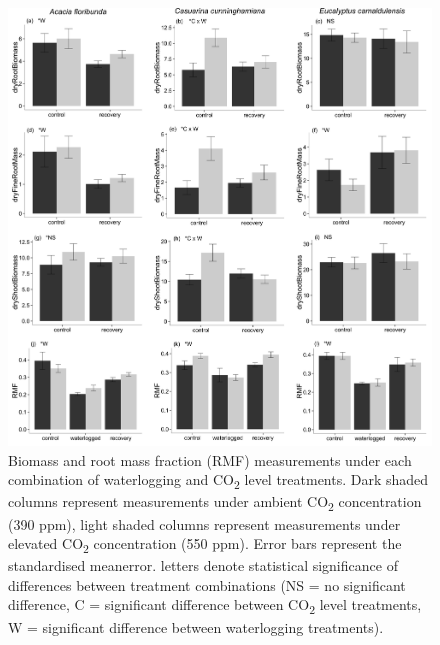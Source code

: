 \documentclass[12pt,a4paper]{memoir}
\begin{document}
\begin{figure}[h!t]
\begin{center}
\includegraphics[width=\linewidth, keepaspectratio=true]{Ch5biomass2.png} %
\caption[Biomass and root mass fraction (RMF) measurements under each combination of waterlogging and CO\textsubscript{2} level treatments.]{\small{Biomass and root mass fraction (RMF) measurements under each combination of waterlogging and CO\textsubscript{2} level treatments. Dark shaded columns represent measurements under ambient CO\textsubscript{2} concentration (390 ppm), light shaded columns represent measurements under elevated CO\textsubscript{2} concentration (550 ppm). Error bars represent the standardised meanerror. \newline* letters denote statistical significance of differences between treatment combinations (NS = no significant difference, C = significant difference between CO\textsubscript{2} level treatments, W = significant difference between waterlogging treatments).}} %
\label{fig:Ch5_F2} %
\end{center}
\end{figure}
\end{document}
